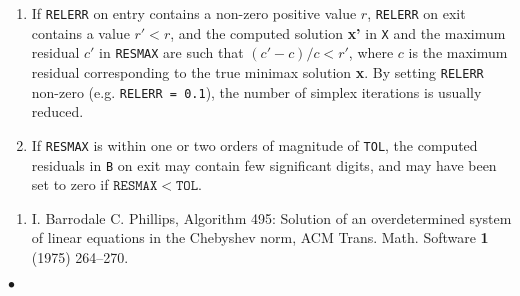 \newpage
\Notes
\begin{enumerate}
\item  If {\tt RELERR} on entry contains a non-zero positive value $r$,
{\tt RELERR} on exit contains a value $r'<r$,
and the computed solution {\bf x'} in {\tt X} and the maximum residual
$c'$ in {\tt RESMAX} are such that $(c'-c)/c < r'$,
where $c$ is the maximum residual corresponding to the true minimax
solution {\bf x}.  By setting {\tt RELERR} non-zero
(e.g. {\tt RELERR = 0.1}),
the number of simplex iterations is usually reduced.
\item If {\tt RESMAX} is within one or two orders of magnitude of
{\tt TOL}, the computed residuals in {\tt B}
on exit may contain few significant digits, and may have been set to
zero if $\mathtt{RESMAX < TOL}$.
\end{enumerate}
\Refer
\begin{enumerate}
\item I. Barrodale  C. Phillips,  Algorithm 495:
Solution of an overdetermined system of linear equations in the
Chebyshev norm, ACM Trans. Math. Software {\bf 1} (1975) 264--270.
\end{enumerate}
$\bullet$
